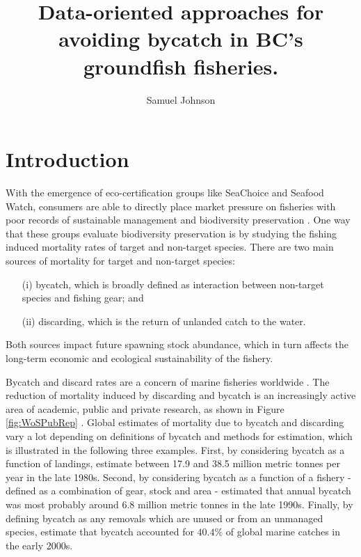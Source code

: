 \documentclass{article}
\title{Data-oriented approaches for avoiding bycatch in BC's groundfish fisheries.}
\author{Samuel Johnson}
\begin{document}
\doublespace

\maketitle

\newpage

{ \small
\tableofcontents
}

\newpage
\section{Introduction}\label{sec:intro}

With the emergence of eco-certification groups like SeaChoice and Seafood Watch, consumers are able to directly place market pressure on fisheries with poor records of sustainable management and biodiversity preservation \citep{Pelc201556}. One way that these groups evaluate biodiversity preservation is by studying the fishing induced mortality rates of target and non-target species. There are two main sources of mortality for target and non-target species: 
\begin{enumerate}
  \item[(i)] bycatch, which is broadly defined as interaction between non-target species and fishing gear; and
  \item[(ii)] discarding, which is the return of unlanded catch to the water.
\end{enumerate}
Both sources impact future spawning stock abundance, which in turn affects the long-term economic and ecological sustainability of the fishery.

Bycatch and discard rates are a concern of marine fisheries worldwide \citep{hall2005managing}. The reduction of mortality induced by discarding and bycatch is an increasingly active area of academic, public and private research, as shown in Figure \ref{fig:WoSPubRep} \citep{saila1983importance,pascoe1997bycatch,FAO1997,gilman2006fleet,davies2009defining}.  Global estimates of mortality due to bycatch and discarding vary a lot depending on definitions of bycatch and methods for estimation, which is illustrated in the following three examples. First, by considering bycatch as a function of landings, \citet{AlversonEtal1994} estimate between 17.9 and 38.5 million metric tonnes per year in the late 1980s. Second, by considering bycatch as a function of a fishery - defined as a combination of gear, stock and area - \citet{kelleher2005discards} estimated that annual bycatch was most probably around 6.8 million metric tonnes in the late 1990s. Finally, by defining bycatch as any removals which are unused or from an unmanaged species, \citet{davies2009defining} estimate that bycatch accounted for $40.4\%$ of global marine catches in the early 2000s.
\end{document}
